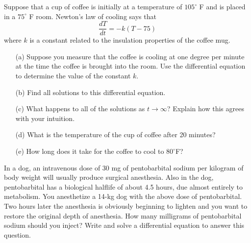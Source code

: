 \begin{problem}
    Suppose that a cup of coffee is initially at a temperature of $105^\circ$ F and is
    placed in a $75^\circ$ F room.  Newton's law of cooling says that 
    \[ \frac{dT}{dt} = -k\left( T - 75 \right) \]
    where $k$ is a constant related to the insulation properties of the coffee mug.  
    \begin{enumerate}
        \item[(a)] Suppose you measure that the coffee is cooling at one degree per minute
            at the time the coffee is brought into the room.  Use the differential
            equation to determine the value of the constant $k$.
        \item[(b)] Find all solutions to this differential equation.
        \item[(c)] What happens to all of the solutions as $t\to\infty$?  Explain how this
            agrees with your intuition.
        \item[(d)] What is the temperature of the cup of coffee after 20 minutes?
        \item[(e)] How long does it take for the coffee to cool to $80^\circ$F?
    \end{enumerate}
\end{problem}

\begin{problem}
    In a dog, an intravenous dose of 30 mg of pentobarbital sodium per kilogram of body
    weight will usually produce surgical anesthesia. Also in the dog, pentobarbital has a
    biological halflife of about 4.5 hours, due almost entirely to metabolism.  You
    anesthetize a 14-kg dog with the above dose of pentobarbital. Two hours later the
    anesthesia is obviously beginning to lighten and you want to restore the original
    depth of anesthesia. How many milligrams of pentobarbital sodium should you inject?
    Write and solve a differential equation to answer this question.
\end{problem}


